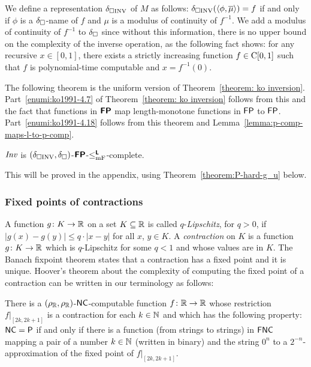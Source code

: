 \documentclass[envcountsame,orivec,oribibl]{llncs}
\begin{document}
We define a representation $\delta _{\square \mathrm{INV}}$ of $M$ as follows:
$\delta _{\square \mathrm{INV}}(\langle \phi, \overline{\mu} \rangle) = f$ 
if and only if $\phi$ is a $\delta _\square$-name of $f$ 
and $\mu$ is a modulus of continuity of $f^{-1}$.
We add a modulus of continuity of $f^{-1}$ to $\delta _\square$
since without this information, there is no upper bound on 
the complexity of the inverse operation, 
as the following fact \cite[Theorem 4.4]{ko1991complexity} shows: 
for any recursive $x \in [0, 1]$, 
there exists a strictly increasing function $f \in \mathrm C[0, 1]$ 
such that $f$ is polynomial-time computable and $x = f^{-1}(0)$.

The following theorem is the uniform version of Theorem~\ref{theorem: ko inversion}. 
Part~\ref{enumi:ko1991-4.7} of Theorem~\ref{theorem: ko inversion} follows from this and the fact that
functions in $\text{\bfseries \sffamily \upshape FP}$ map length-monotone functions in $\mathsf{FP}$ to $\mathsf{FP}$.
Part~\ref{enumi:ko1991-4.18} follows from this theorem and Lemma~\ref{lemma:p-comp-maps-l-to-p-comp}.

\begin{theorem}
 \label{theorem:INV-is-P-complete}
 $\mathit{Inv}$ is $(\delta _{\square \mathrm{INV}}, \delta _\square)$-$\text{\bfseries \sffamily \upshape FP}$-$\leq _{\mathrm{mF}} ^{\text{\bfseries \sffamily \upshape L}}$-complete.
\end{theorem}

This will be proved in the appendix, 
using 
Theorem~\ref{theorem:P-hard-g_u} below. 

\subsubsection{Fixed points of contractions}

A function $g \colon K \to \mathbb R$ on a set $K \subseteq \mathbb R$
is called $q$-\emph{Lipschitz}, for $q > 0$, 
if $
\lvert g (x) - g (y) \rvert \leq q \cdot \lvert x - y \rvert
$ for all $x$, $y \in K$. 
A \emph{contraction} on $K$ is 
a function $g \colon K \to \mathbb R$ which is $q$-Lipschitz for some $q < 1$
and whose values are in $K$. 
The Banach fixpoint theorem states that 
a contraction has a fixed point and it is unique. 
Hoover's theorem about the complexity of computing the fixed point
of a contraction can be written in our terminology as follows:

\begin{theorem}
\label{theorem:hoover1991-4.5}
 There is a $(\rho _\mathbb R, \rho _\mathbb R)$-$\mathsf{NC}$-computable function $f \colon \mathbb R \to \mathbb R$
 whose restriction $f|_{[2k, 2k+1]}$ is a contraction for each $k \in \mathbb N$ and
 which has the following property: 
 $\mathsf{NC} = \mathsf{P}$ if and only if 
 there is a function (from strings to strings) in $\mathsf{FNC}$ mapping 
 a pair of a number $k \in \mathbb N$ (written in binary) and the string $0^n$
 to a $2^{-n}$-approximation of the 
 fixed point of $f |_{[2k, 2k + 1]}$. 
\end{theorem}
\end{document}
